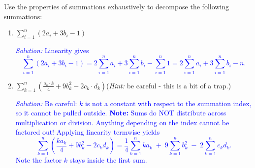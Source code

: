 \documentclass[10pt]{article}
\begin{document}
\vfill

{\exercise} Use the properties of summations exhaustively to decompose the following summations:
\begin{enumerate}
    \item[(a)] $\displaystyle\sum_{i=1}^n (2a_i+3b_i-1)$
        \par\noindent\textcolor{blue}{\emph{Solution:} Linearity gives
        \[
        \sum_{i=1}^n (2a_i+3b_i-1)=2\sum_{i=1}^n a_i +3\sum_{i=1}^n b_i -\sum_{i=1}^n 1
        =2\sum_{i=1}^n a_i +3\sum_{i=1}^n b_i - n.
        \]}
        \vfill
    \item[(b)] $\displaystyle\sum_{k=1}^n \left(\frac{a_k\cdot k}4+9b_k^2-2c_k\cdot d_k\right)$\quad(\emph{Hint:} be careful - this is a bit of a trap.)
        \par\noindent\textcolor{blue}{\emph{Solution:} Be careful: $k$ is not a constant with respect to the summation index, so it cannot be pulled outside. \textbf{Note:} Sums do NOT distribute across multiplication or division. Anything depending on the index cannot be factored out! Applying linearity termwise yields
        \[
        \sum_{k=1}^n \left(\frac{k a_k}{4}+9b_k^2-2c_k d_k\right)
        =\frac{1}{4}\sum_{k=1}^n k a_k \;+\;9\sum_{k=1}^n b_k^2 \;-\;2\sum_{k=1}^n c_k d_k.
        \]
        Note the factor $k$ stays inside the first sum.}
        \vfill
\end{enumerate}
\end{document}
